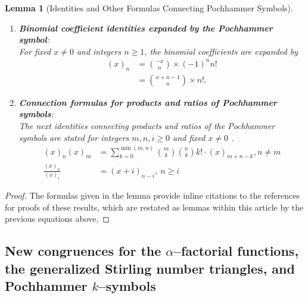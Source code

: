 \documentclass[12pt,reqno]{article}
\numberwithin{sfootnote}{section}
\numberwithin{equation}{section}
\newcommand{\itemlabel}[1]{\textbf{#1}: \\ }
\theoremstyle{DefaultTheoremStyle}
\newtheorem{lemma}[theorem]{Lemma}
\theoremstyle{definition}
\newcommand{\Pochhammer}[2]{\ensuremath{\left(#1\right)_{#2}}}
\begin{document}
\begin{lemma}[Identities and Other Formulas Connecting Pochhammer Symbols]
\begin{enumerate}
\item \itemlabel{Binomial coefficient identities expanded by the 
                 Pochhammer symbol} 
For fixed $x \neq 0$ and integers $n \geq 1$, the 
binomial coefficients are expanded by 
\citep{CVLPOLYS,WOLFRAMFNSSITE-INTRO-FACTBINOMS} 
\begin{align*} 
\tag{\em Binomial Coefficient Identities} 
\Pochhammer{x}{n} 
     & = 
     \binom{-x}{n} \times (-1)^{n} n! \\ 
     & = 
     \binom{x+n-1}{n} \times n!. 
\end{align*} 

\item \itemlabel{Connection formulas for products and 
                 ratios of Pochhammer symbols} 
The next identities connecting products and ratios of the 
Pochhammer symbols are stated 
for integers $m, n, i \geq 0$ and fixed $x \neq 0$
\citep[Ex.\ 1.23, p.\ 83]{ADVCOMB} 
\citep{WOLFRAMFNSSITE-INTRO-FACTBINOMS}. 
\begin{align*} 
\tag{\em Connection Formulas for Products} 
\Pochhammer{x}{n} \Pochhammer{x}{m} 
     & = 
     \sum_{k=0}^{\min(m, n)} \binom{m}{k} \binom{n}{k} k! \cdot 
     \Pochhammer{x}{m+n-k}, n \neq m \\ 
\tag{\em Fractions of Pochhammer Symbols} 
\frac{\Pochhammer{x}{n}}{\Pochhammer{x}{i}} 
     & = 
     \Pochhammer{x+i}{n-i},\ n \geq i 
\end{align*} 

\end{enumerate} 
\end{lemma} 
\begin{proof} 
The formulas given in the lemma provide inline citations to the 
references for proofs of these 
results, which are restated as lemmas within this article by 
the previous equations above. 
\end{proof} 

\subsection{New congruences for the 
            $\alpha$--factorial functions, the 
            generalized Stirling number triangles, and 
            Pochhammer $k$--symbols} 
\label{subSection_NewCongruence_Relations_Modulo_Integer_Bases} 
\label{subSection_Congruences_for_Series_ModuloIntegers_p} 
\end{document}

